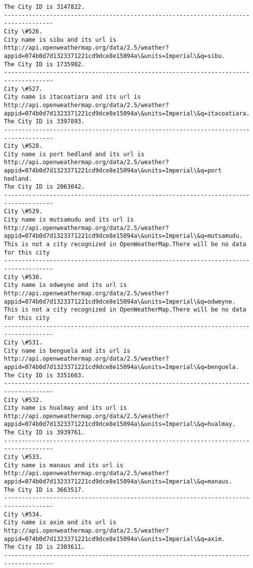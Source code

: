 \documentclass[11pt]{article}
\begin{document}
\begin{Verbatim}[commandchars=\\\{\}]
The City ID is 3147822.
------------------------------------------------------------------------------------
City \#526.
City name is sibu and its url is http://api.openweathermap.org/data/2.5/weather?appid=074b0d7d1323371221cd9dce8e15094a\&units=Imperial\&q=sibu.
The City ID is 1735902.
------------------------------------------------------------------------------------
City \#527.
City name is itacoatiara and its url is http://api.openweathermap.org/data/2.5/weather?appid=074b0d7d1323371221cd9dce8e15094a\&units=Imperial\&q=itacoatiara.
The City ID is 3397893.
------------------------------------------------------------------------------------
City \#528.
City name is port hedland and its url is http://api.openweathermap.org/data/2.5/weather?appid=074b0d7d1323371221cd9dce8e15094a\&units=Imperial\&q=port hedland.
The City ID is 2063042.
------------------------------------------------------------------------------------
City \#529.
City name is mutsamudu and its url is http://api.openweathermap.org/data/2.5/weather?appid=074b0d7d1323371221cd9dce8e15094a\&units=Imperial\&q=mutsamudu.
This is not a city recognized in OpenWeatherMap.There will be no data for this city
------------------------------------------------------------------------------------
City \#530.
City name is odweyne and its url is http://api.openweathermap.org/data/2.5/weather?appid=074b0d7d1323371221cd9dce8e15094a\&units=Imperial\&q=odweyne.
This is not a city recognized in OpenWeatherMap.There will be no data for this city
------------------------------------------------------------------------------------
City \#531.
City name is benguela and its url is http://api.openweathermap.org/data/2.5/weather?appid=074b0d7d1323371221cd9dce8e15094a\&units=Imperial\&q=benguela.
The City ID is 3351663.
------------------------------------------------------------------------------------
City \#532.
City name is hualmay and its url is http://api.openweathermap.org/data/2.5/weather?appid=074b0d7d1323371221cd9dce8e15094a\&units=Imperial\&q=hualmay.
The City ID is 3939761.
------------------------------------------------------------------------------------
City \#533.
City name is manaus and its url is http://api.openweathermap.org/data/2.5/weather?appid=074b0d7d1323371221cd9dce8e15094a\&units=Imperial\&q=manaus.
The City ID is 3663517.
------------------------------------------------------------------------------------
City \#534.
City name is axim and its url is http://api.openweathermap.org/data/2.5/weather?appid=074b0d7d1323371221cd9dce8e15094a\&units=Imperial\&q=axim.
The City ID is 2303611.
------------------------------------------------------------------------------------

\end{Verbatim}
\end{document}
